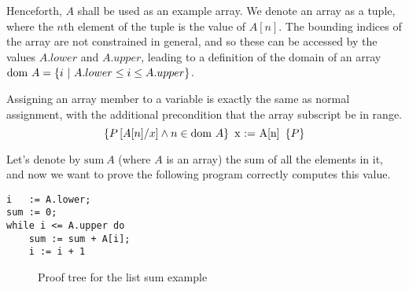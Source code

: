 Henceforth, $A$ shall be used as an example array. We denote an array
as a tuple, where the $n$th element of the tuple is the value of
$A[n]$. The bounding indices of the array are not constrained in
general, and so these can be accessed by the values $A.lower$ and
$A.upper$, leading to a definition of the domain of an array $\dom~A =
\{i~|~A.lower \leq i \leq A.upper\}$.

\begin{definition}
  Assigning an array member to a variable is exactly the same as
  normal assignment, with the additional precondition that the array
  subscript be in range.
  \[\htriple{P\left[A[n]/x\right] \land n \in \dom~A}{x := A[n]}{P}\]
\end{definition}

\begin{example}
  \label{exmpl:heap-sum}
  
  Let's denote by $\mathrm{sum}~A$ (where $A$ is an array) the sum of
  all the elements in it, and now we want to prove the following
  program correctly computes this value.

\begin{verbatim}
i   := A.lower;
sum := 0;
while i <= A.upper do
    sum := sum + A[i];
    i := i + 1
\end{verbatim}

  \begin{figure}[t]
    \centering
      \begin{prooftree}




      \end{prooftree}
    \caption{Proof tree for the list sum example}
    \label{fig:exmpl:heap-sum-tree}
  \end{figure}


\end{example}
